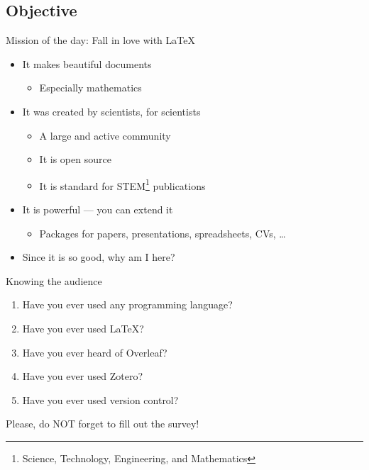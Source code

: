\documentclass{beamer}
\begin{document}
\subsection{Objective}
\begin{frame}{Mission of the day: Fall in love with \LaTeX{}}
\begin{itemize}
\item It makes beautiful documents
\begin{itemize}
\item Especially mathematics
\end{itemize}
%
\item It was created by scientists, for scientists
\begin{itemize}
\item A large and active community
\item It is open source
\item It is standard for STEM\footnote{Science, Technology, Engineering, and Mathematics} publications
\end{itemize}
%
\item It is powerful --- you can extend it
\begin{itemize}
\item Packages for papers, presentations, spreadsheets, CVs, \ldots
\end{itemize}
    \item Since it is so good, why am I here?
\end{itemize}
\end{frame}


\begin{frame}{Knowing the audience}
    \begin{enumerate}
        \item Have you ever used any programming language?
        \item Have you ever used \LaTeX{}?
        \item Have you ever heard of Overleaf?
        \item Have you ever used Zotero?
        \item Have you ever used version control?
        \end{enumerate}
         \vspace{20 pt}
         Please, do NOT forget to fill out the survey!
    


\end{frame}
\end{document}
